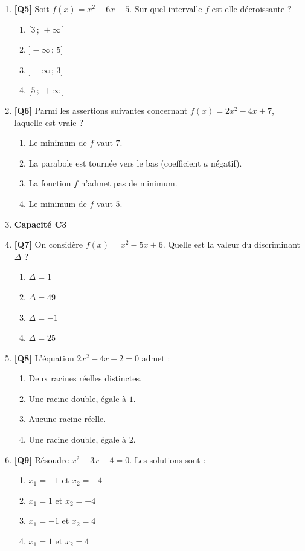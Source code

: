 \begin{enumerate}
\item \textbf{[Q5]} Soit $f(x) = x^2 - 6x + 5$. Sur quel intervalle $f$ est-elle décroissante ?
  \begin{enumerate}[label=\Alph*.]
    \item $[3\,;\,+\infty[$
    \item $]-\infty\,;\,5]$
    \item $]-\infty\,;\,3]$
    \item $[5\,;\,+\infty[$
  \end{enumerate}

\item \textbf{[Q6]} Parmi les assertions suivantes concernant $f(x) = 2x^2 - 4x + 7$, laquelle est vraie ?
  \begin{enumerate}[label=\Alph*.]
    \item Le minimum de $f$ vaut $7$.
    \item La parabole est tournée vers le bas (coefficient $a$ négatif).
    \item La fonction $f$ n'admet pas de minimum.
    \item Le minimum de $f$ vaut $5$.
  \end{enumerate}

\item[] \textbf{Capacité C3}

\item \textbf{[Q7]} On considère $f(x) = x^2 - 5x + 6$. Quelle est la valeur du discriminant $\Delta$ ?
  \begin{enumerate}[label=\Alph*.]
    \item $\Delta = 1$
    \item $\Delta = 49$
    \item $\Delta = -1$
    \item $\Delta = 25$
  \end{enumerate}

\item \textbf{[Q8]} L'équation $2x^2 - 4x + 2 = 0$ admet :
  \begin{enumerate}[label=\Alph*.]
    \item Deux racines réelles distinctes.
    \item Une racine double, égale à $1$.
    \item Aucune racine réelle.
    \item Une racine double, égale à $2$.
  \end{enumerate}

\item \textbf{[Q9]} Résoudre $x^2 - 3x - 4 = 0$. Les solutions sont :
  \begin{enumerate}[label=\Alph*.]
    \item $x_1 = -1$ et $x_2 = -4$
    \item $x_1 = 1$ et $x_2 = -4$
    \item $x_1 = -1$ et $x_2 = 4$
    \item $x_1 = 1$ et $x_2 = 4$
  \end{enumerate}


\end{enumerate}
